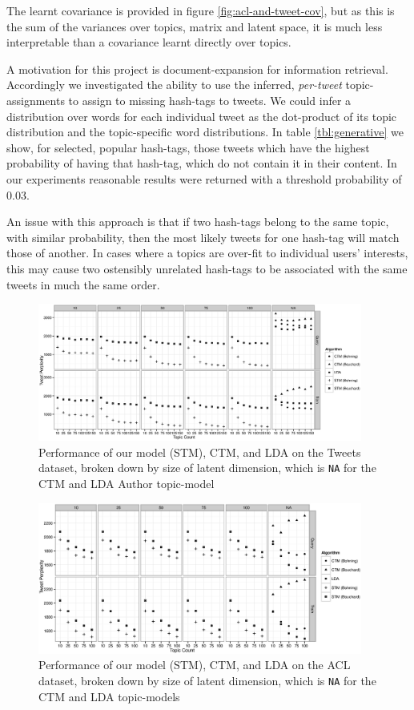 The learnt covariance is provided in figure \ref{fig:acl-and-tweet-cov}, but as this is the sum of the variances over topics, matrix and latent space, it is much less interpretable than a covariance learnt directly over topics.

A motivation for this project is document-expansion for information retrieval. Accordingly we investigated the ability to use the inferred, \emph{per-tweet} topic-assignments to assign to missing hash-tags to tweets. We could infer a distribution over words for each individual tweet as the dot-product of its topic distribution and the topic-specific word distributions. 
In table \ref{tbl:generative} we show, for selected, popular hash-tags, those tweets which have the highest probability of having that hash-tag, which do not contain it in their content. In our experiments reasonable results were returned with a threshold probability of 0.03.

An issue with this approach is that if two hash-tags belong to the same topic, with similar probability, then the most likely tweets for one hash-tag will match those of another. In cases where a topics are over-fit to individual users' interests, this may cause two ostensibly unrelated hash-tags to be associated with the same tweets in much the same order.

\begin{figure}
\centering
    \includegraphics[width=0.95\textwidth]{Chap3/plots/tweet-all.eps}
    \caption{Performance of our model (STM), CTM, and LDA on the Tweets dataset, broken down by size of latent dimension, which is {\tt NA} for the CTM and LDA Author topic-model}
    \label{fig:tweet-all}
\end{figure}

\begin{figure}
\centering
    \includegraphics[width=0.95\textwidth]{Chap3/plots/acl-all.eps}
    \caption{Performance of our model (STM), CTM, and LDA on the ACL dataset, broken down by size of latent dimension, which is {\tt NA} for the CTM and LDA topic-models}
    \label{fig:acl-all}
\end{figure}

